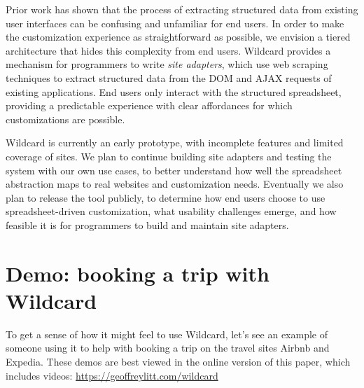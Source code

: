 \documentclass[english,submission]{programming}
\begin{document}
Prior work \autocite{huynh2006} has shown that the process of extracting
structured data from existing user interfaces can be confusing and
unfamiliar for end users. In order to make the customization experience
as straightforward as possible, we envision a tiered architecture that
hides this complexity from end users. Wildcard provides a mechanism for
programmers to write \emph{site adapters}, which use web scraping
techniques to extract structured data from the DOM and AJAX requests of
existing applications. End users only interact with the structured
spreadsheet, providing a predictable experience with clear affordances
for which customizations are possible.

Wildcard is currently an early prototype, with incomplete features and
limited coverage of sites. We plan to continue building site adapters
and testing the system with our own use cases, to better understand how
well the spreadsheet abstraction maps to real websites and customization
needs. Eventually we also plan to release the tool publicly, to
determine how end users choose to use spreadsheet-driven customization,
what usability challenges emerge, and how feasible it is for programmers
to build and maintain site adapters.

\hypertarget{demo-booking-a-trip-with-wildcard}{%
\section{Demo: booking a trip with
Wildcard}\label{demo-booking-a-trip-with-wildcard}}

To get a sense of how it might feel to use Wildcard, let's see an
example of someone using it to help with booking a trip on the travel
sites Airbnb and Expedia. These demos are best viewed in the online
version of this paper, which includes videos:
\url{https://geoffreylitt.com/wildcard}
\end{document}
